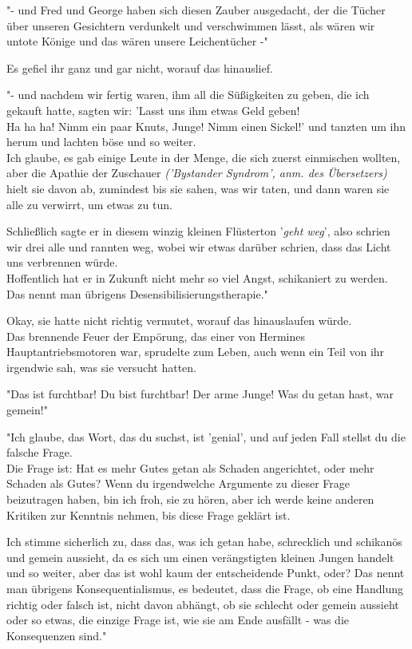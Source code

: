 {"- und Fred und George haben sich diesen Zauber ausgedacht, der die Tücher über unseren Gesichtern verdunkelt und verschwimmen lässt, als wären wir untote Könige und das wären unsere Leichentücher -"

Es gefiel ihr ganz und gar nicht, worauf das hinauslief.

"- und nachdem wir fertig waren, ihm all die Süßigkeiten zu geben, die ich gekauft hatte, sagten wir: 'Lasst uns ihm etwas Geld geben!\\ Ha ha ha! Nimm ein paar Knuts, Junge! Nimm einen Sickel!' und tanzten um ihn herum und lachten böse und so weiter.\\ Ich glaube, es gab einige Leute in der Menge, die sich zuerst einmischen wollten, aber die Apathie der Zuschauer \emph{('Bystander Syndrom', anm. des Übersetzers)} hielt sie davon ab, zumindest bis sie sahen, was wir taten, und dann waren sie alle zu verwirrt, um etwas zu tun.

Schließlich sagte er in diesem winzig kleinen Flüsterton '\emph{geht weg}', also schrien wir drei alle und rannten weg, wobei wir etwas darüber schrien, dass das Licht uns verbrennen würde.\\ Hoffentlich hat er in Zukunft nicht mehr so viel Angst, schikaniert zu werden. Das nennt man übrigens Desensibilisierungstherapie."

Okay, sie hatte nicht richtig vermutet, worauf das hinauslaufen würde.\\ Das brennende Feuer der Empörung, das einer von Hermines Hauptantriebsmotoren war, sprudelte zum Leben, auch wenn ein Teil von ihr irgendwie sah, was sie versucht hatten.

"Das ist furchtbar! Du bist furchtbar! Der arme Junge! Was du getan hast, war gemein!"

"Ich glaube, das Wort, das du suchst, ist 'genial', und auf jeden Fall stellst du die falsche Frage.\\ Die Frage ist: Hat es mehr Gutes getan als Schaden angerichtet, oder mehr Schaden als Gutes? Wenn du irgendwelche Argumente zu dieser Frage beizutragen haben, bin ich froh, sie zu hören, aber ich werde keine anderen Kritiken zur Kenntnis nehmen, bis diese Frage geklärt ist.

Ich stimme sicherlich zu, dass das, was ich getan habe, schrecklich und schikanös und gemein aussieht, da es sich um einen verängstigten kleinen Jungen handelt und so weiter, aber das ist wohl kaum der entscheidende Punkt, oder? Das nennt man übrigens Konsequentialismus, es bedeutet, dass die Frage, ob eine Handlung richtig oder falsch ist, nicht davon abhängt, ob sie schlecht oder gemein aussieht oder so etwas, die einzige Frage ist, wie sie am Ende ausfällt - was die Konsequenzen sind."

}

